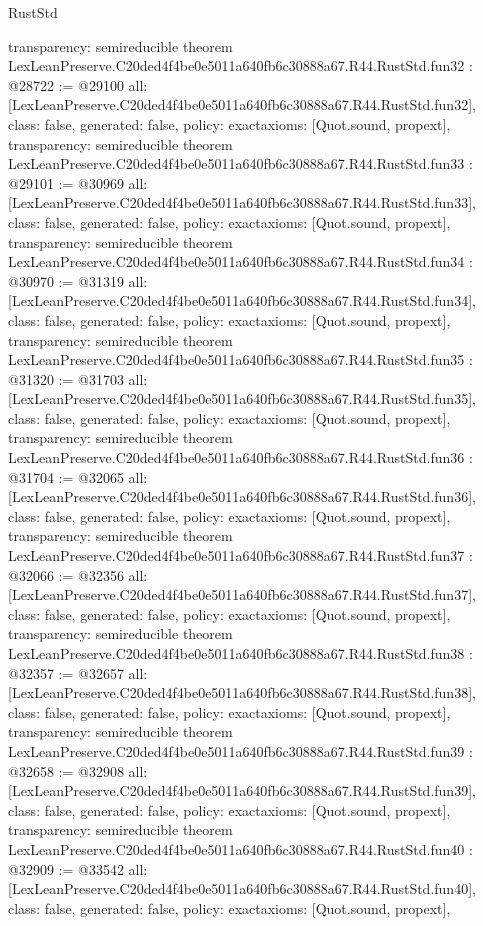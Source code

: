 \begin{lexlean}{RustStd}
\begin{coremodule}
{  transparency: semireducible
}
theorem LexLeanPreserve.C20ded4f4be0e5011a640fb6c30888a67.R44.RustStd.fun32 : @28722 := @29100 {
  all: [LexLeanPreserve.C20ded4f4be0e5011a640fb6c30888a67.R44.RustStd.fun32],
  class: false,
  generated: false,
  policy: exact{axioms: [Quot.sound, propext]},
  transparency: semireducible
}
theorem LexLeanPreserve.C20ded4f4be0e5011a640fb6c30888a67.R44.RustStd.fun33 : @29101 := @30969 {
  all: [LexLeanPreserve.C20ded4f4be0e5011a640fb6c30888a67.R44.RustStd.fun33],
  class: false,
  generated: false,
  policy: exact{axioms: [Quot.sound, propext]},
  transparency: semireducible
}
theorem LexLeanPreserve.C20ded4f4be0e5011a640fb6c30888a67.R44.RustStd.fun34 : @30970 := @31319 {
  all: [LexLeanPreserve.C20ded4f4be0e5011a640fb6c30888a67.R44.RustStd.fun34],
  class: false,
  generated: false,
  policy: exact{axioms: [Quot.sound, propext]},
  transparency: semireducible
}
theorem LexLeanPreserve.C20ded4f4be0e5011a640fb6c30888a67.R44.RustStd.fun35 : @31320 := @31703 {
  all: [LexLeanPreserve.C20ded4f4be0e5011a640fb6c30888a67.R44.RustStd.fun35],
  class: false,
  generated: false,
  policy: exact{axioms: [Quot.sound, propext]},
  transparency: semireducible
}
theorem LexLeanPreserve.C20ded4f4be0e5011a640fb6c30888a67.R44.RustStd.fun36 : @31704 := @32065 {
  all: [LexLeanPreserve.C20ded4f4be0e5011a640fb6c30888a67.R44.RustStd.fun36],
  class: false,
  generated: false,
  policy: exact{axioms: [Quot.sound, propext]},
  transparency: semireducible
}
theorem LexLeanPreserve.C20ded4f4be0e5011a640fb6c30888a67.R44.RustStd.fun37 : @32066 := @32356 {
  all: [LexLeanPreserve.C20ded4f4be0e5011a640fb6c30888a67.R44.RustStd.fun37],
  class: false,
  generated: false,
  policy: exact{axioms: [Quot.sound, propext]},
  transparency: semireducible
}
theorem LexLeanPreserve.C20ded4f4be0e5011a640fb6c30888a67.R44.RustStd.fun38 : @32357 := @32657 {
  all: [LexLeanPreserve.C20ded4f4be0e5011a640fb6c30888a67.R44.RustStd.fun38],
  class: false,
  generated: false,
  policy: exact{axioms: [Quot.sound, propext]},
  transparency: semireducible
}
theorem LexLeanPreserve.C20ded4f4be0e5011a640fb6c30888a67.R44.RustStd.fun39 : @32658 := @32908 {
  all: [LexLeanPreserve.C20ded4f4be0e5011a640fb6c30888a67.R44.RustStd.fun39],
  class: false,
  generated: false,
  policy: exact{axioms: [Quot.sound, propext]},
  transparency: semireducible
}
theorem LexLeanPreserve.C20ded4f4be0e5011a640fb6c30888a67.R44.RustStd.fun40 : @32909 := @33542 {
  all: [LexLeanPreserve.C20ded4f4be0e5011a640fb6c30888a67.R44.RustStd.fun40],
  class: false,
  generated: false,
  policy: exact{axioms: [Quot.sound, propext]},
}
\end{coremodule}
\end{lexlean}
